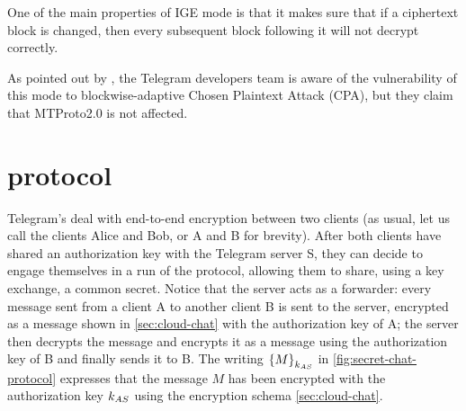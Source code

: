 One of the main properties of IGE mode is that it makes sure that if a ciphertext block is changed, then every subsequent block following it will not decrypt correctly.

As pointed out by \cite{Telegram-AFAQ-IGE}, the Telegram developers team is aware of the vulnerability of this mode to blockwise-adaptive Chosen Plaintext Attack (CPA)\cite{IGE-CPA}, but they claim that MTProto2.0 is not affected.




\section{\Schat{} protocol}
\label{sec:secret-chat}

Telegram's \schats{} deal with end-to-end encryption between two clients (as usual, let us call the clients Alice and Bob, or A and B for brevity). After both clients have shared an authorization key with the Telegram server S, they can decide to engage themselves in a run of the \schat{} protocol, allowing them to share, using a \DiHe{} key exchange, a common secret. Notice that the server acts as a forwarder: every message sent from a client A to another client B is sent to the server, encrypted as a \cchat{} message shown in \cref{sec:cloud-chat} with the authorization key of A; the server then decrypts the message and encrypts it as a \cchat{} message using the authorization key of B and finally sends it to B. The writing $\left\{M\right\}_{k_{AS}}$ in \cref{fig:secret-chat-protocol} expresses that the message $M$ has been encrypted with the authorization key $k_{AS}$ using the \cchat{} encryption schema \cref{sec:cloud-chat}.

